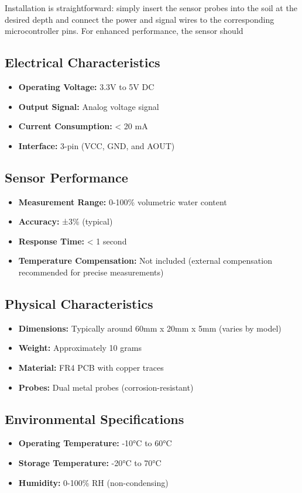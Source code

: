 Installation is straightforward: simply insert the sensor probes into the soil at the desired depth and connect the power and signal wires to the corresponding microcontroller pins. For enhanced performance, the sensor should

\subsection*{Electrical Characteristics}
\begin{itemize}
	\item \textbf{Operating Voltage:} 3.3V to 5V DC
	\item \textbf{Output Signal:} Analog voltage signal
	\item \textbf{Current Consumption:} < 20 mA
	\item \textbf{Interface:} 3-pin (VCC, GND, and AOUT)
\end{itemize}

\subsection*{Sensor Performance}
\begin{itemize}
	\item \textbf{Measurement Range:} 0-100\% volumetric water content
	\item \textbf{Accuracy:} ±3\% (typical)
	\item \textbf{Response Time:} < 1 second
	\item \textbf{Temperature Compensation:} Not included (external compensation recommended for precise measurements)
\end{itemize}

\subsection*{Physical Characteristics}
\begin{itemize}
	\item \textbf{Dimensions:} Typically around 60mm x 20mm x 5mm (varies by model)
	\item \textbf{Weight:} Approximately 10 grams
	\item \textbf{Material:} FR4 PCB with copper traces
	\item \textbf{Probes:} Dual metal probes (corrosion-resistant)
\end{itemize}

\subsection*{Environmental Specifications}
\begin{itemize}
	\item \textbf{Operating Temperature:} -10°C to 60°C
	\item \textbf{Storage Temperature:} -20°C to 70°C
	\item \textbf{Humidity:} 0-100\% RH (non-condensing)
\end{itemize}

